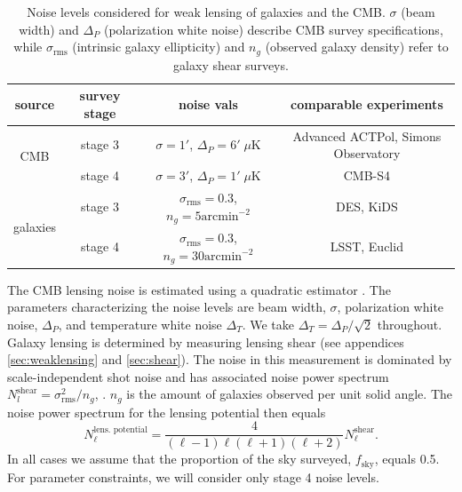 \documentclass[11pt]{article} %
\begin{document}
\begin{table}[h!]
    \centering
    \begin{tabular}{|c|c|c|c|}
    \hline
    \textbf{source} & \textbf{survey stage} & \textbf{noise vals} & \textbf{comparable experiments} \\
    \hline 
    \multirow{2}{*}{CMB} 
        & stage 3 & $\sigma = 1'$, $\Delta_P = 6' \; \mu \text{K}$ & Advanced ACTPol, Simons Observatory \\
    \cline{2-4}
        & stage 4 & $\sigma = 3'$, $\Delta_P = 1' \; \mu \text{K}$ & CMB-S4 \\
    \hline
    \multirow{2}{*}{galaxies} 
        & stage 3 & $\sigma_{\text{rms}} = 0.3$, $n_g = 5 \text{arcmin}^{-2}$ & DES, KiDS \\
    \cline{2-4}
        & stage 4 & $\sigma_{\text{rms}} = 0.3$, $n_g = 30 \text{arcmin}^{-2}$ & LSST, Euclid \\
    \hline
    \end{tabular}
    \caption{Noise levels considered for weak lensing of galaxies and the CMB. $\sigma$ (beam width) and $\Delta_P$ (polarization white noise) describe CMB survey specifications, while $\sigma_{\text{rms}}$ (intrinsic galaxy ellipticity) and $n_g$ (observed galaxy density) refer to galaxy shear surveys.}
    \label{tab:noiselevels}
\end{table}

The CMB lensing noise is estimated using a quadratic estimator \cite{cmblensingestimator}.
The parameters characterizing the noise levels are beam width, $\sigma$, polarization white noise, $\Delta_P$, and temperature white noise $\Delta_T$. We take $\Delta_T = \Delta_P / \sqrt 2$ throughout. Galaxy lensing is determined by measuring lensing shear (see appendices \ref{sec:weaklensing} and \ref{sec:shear}). The noise in this measurement is dominated by scale-independent shot noise and has associated noise power spectrum $N_l^{\text{shear}} = \sigma_{\text{rms}}^2 / n_g$, \cite{bartelmann2001weak}. $n_g$ is the amount of galaxies observed per unit solid angle. The noise power spectrum for the lensing potential then equals
\begin{equation*}
    N_\ell^{\text{lens. potential}} = \frac{4}{(\ell-1)\ell(\ell+1)(\ell+2)}N_\ell^{\text{shear}}.
\end{equation*}
In all cases we assume that the proportion of the sky surveyed, $f_{\text{sky}}$, equals 0.5.
For parameter constraints, we will consider only stage 4 noise levels.
\end{document}
